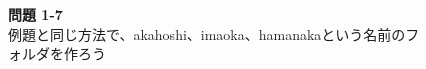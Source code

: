 \begin{figure}
  \noindent \textbf{問題 1-7}\\
  例題と同じ方法で、akahoshi、imaoka、hamanakaという名前のフォルダを作ろう


\end{figure}
\clearpage




